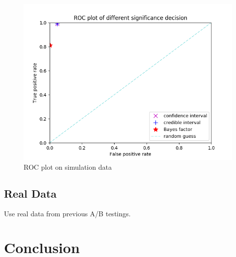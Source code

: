 \documentclass[paper=a4, fontsize=11pt]{scrartcl} %
\numberwithin{equation}{section} %
\numberwithin{figure}{section} %
\numberwithin{table}{section} %
\begin{document}
\begin{figure} 
\centering
\includegraphics[scale=.6]{roc_sim_data.png}
\caption{ROC plot on simulation data}
\label{fig:roc_sim_data}
\end{figure}

\subsection{Real Data}
Use real data from previous A/B testings.

\section{Conclusion}

\end{document}
